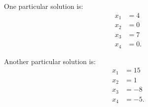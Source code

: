 {\begin{center}
\begin{minipage}{.4\linewidth}
One particular solution is:
\begin{align*} x_1 &= 4\\ x_2 &=0 \\ x_3 &= 7 \\ x_4 &= 0. \end{align*}
\end{minipage}
\begin{minipage}{.4\linewidth}
Another particular solution is:
\begin{align*} x_1 &= 15\\ x_2 &=1 \\ x_3 &= -8 \\ x_4 &= -5. \end{align*}
\end{minipage}
\end{center}
}

\medskip

